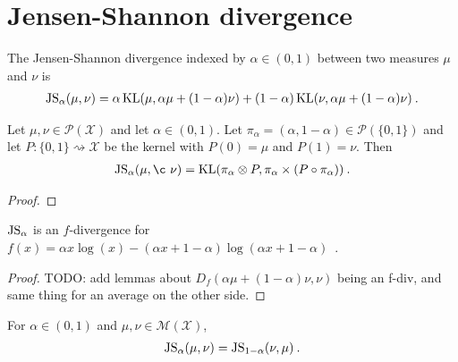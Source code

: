 \section{Jensen-Shannon divergence}

\begin{definition}
  \label{def:jensenShannon}
  The Jensen-Shannon divergence indexed by $\alpha \in (0,1)$ between two measures $\mu$ and $\nu$ is
  \begin{align*}
    \operatorname{JS}_\alpha(\mu, \nu) = \alpha \operatorname{KL}(\mu, \alpha \mu + (1 - \alpha)\nu) + (1 - \alpha) \operatorname{KL}(\nu, \alpha \mu + (1 - \alpha)\nu) \: .
  \end{align*}
\end{definition}


\begin{lemma}
  \label{lem:jensenShannon_eq_kl}
  Let $\mu, \nu \in \mathcal P(\mathcal X)$ and let $\alpha \in (0, 1)$. Let $\pi_\alpha = (\alpha, 1 - \alpha) \in \mathcal P(\{0,1\})$ and let $P : \{0,1\} \rightsquigarrow \mathcal X$ be the kernel with $P(0) = \mu$ and $P(1) = \nu$. Then
  \begin{align*}
  \JS_\alpha(\mu, ¸\nu) = \KL(\pi_\alpha \otimes P, \pi_\alpha \times (P \circ \pi_\alpha)) \: .
  \end{align*}
\end{lemma}

\begin{proof}%
\uses{}

\end{proof}


\begin{lemma}
  \label{lem:jensenShannon_eq_fDiv}
  $\operatorname{JS}_\alpha$ is an $f$-divergence for $f(x) = \alpha x \log(x) - (\alpha x + 1 - \alpha) \log (\alpha x + 1 - \alpha)$~.
\end{lemma}

\begin{proof}%
\uses{}
TODO: add lemmas about $D_f(\alpha \mu + (1 - \alpha) \nu, \nu)$ being an f-div, and same thing for an average on the other side.
\end{proof}


\begin{lemma}
  \label{lem:jensenShannon_symm}
  For $\alpha \in (0,1)$ and $\mu, \nu \in \mathcal M(\mathcal X)$,
  \begin{align*}
  \operatorname{JS}_\alpha(\mu, \nu) = \operatorname{JS}_{1 - \alpha}(\nu, \mu) \: .
  \end{align*}
\end{lemma}

